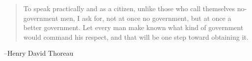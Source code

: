 \documentclass{exam}
\begin{document}
\begin{description}
    \end{description}

  \else
    \vspace{8 cm}

    \begin{quote}
      \begin{em}
	To speak practically and as a citizen, unlike those who call themselves
	no-government men, I ask for, not at once no government, but at once a better
	government. Let every man make known what kind of government would command his
	respect, and that will be one step toward obtaining it.     
      \end{em}
    \end{quote}
    \hspace{1 cm} --Henry David Thoreau
  \fi
\end{document}
